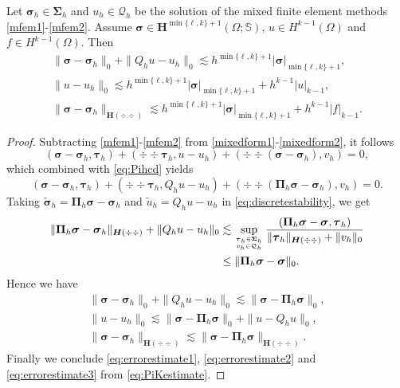 \begin{theorem}
Let $\boldsymbol \sigma_h\in\boldsymbol\Sigma_h$ and $u_h\in \mathcal Q_h$ be the solution of the mixed finite element methods \eqref{mfem1}-\eqref{mfem2}. Assume $\boldsymbol \sigma\in\boldsymbol{H}^{\min\{\ell,k\}+1}(\Omega; \mathbb{S})$, $u\in H^{k-1}(\Omega)$ and $f\in H^{k-1}(\Omega)$. Then
\begin{align}
\label{eq:errorestimate1}
\|\boldsymbol{\sigma}-\boldsymbol{\sigma}_h\|_0+\|Q_h u-u_h\|_0\lesssim h^{\min\{\ell,k\}+1}|\boldsymbol \sigma|_{\min\{\ell,k\}+1},
\\
\label{eq:errorestimate2}
\|u-u_h\|_0\lesssim h^{\min\{\ell,k\}+1}|\boldsymbol \sigma|_{\min\{\ell,k\}+1}+h^{k-1}|u|_{k-1},
\\
\label{eq:errorestimate3}
\|\boldsymbol{\sigma}-\boldsymbol{\sigma}_h\|_{\boldsymbol{H}(\div{\div })}\lesssim h^{\min\{\ell,k\}+1}|\boldsymbol \sigma|_{\min\{\ell,k\}+1}+h^{k-1}|f|_{k-1}.
\end{align}
\end{theorem}
\begin{proof}
Subtracting \eqref{mfem1}-\eqref{mfem2} from \eqref{mixedform1}-\eqref{mixedform2}, it follows
\[
(\boldsymbol{\sigma}-\boldsymbol{\sigma}_h, \boldsymbol{\tau}_h)+(\div \div\boldsymbol{\tau}_h, u-u_h)+(\div\div(\boldsymbol{\sigma}-\boldsymbol{\sigma}_h), v_h)=0,
\]
which combined with \eqref{eq:Pihcd} yields
\begin{equation}\label{eq:errorequation}
(\boldsymbol{\sigma}-\boldsymbol{\sigma}_h, \boldsymbol{\tau}_h)+(\div\div\boldsymbol{\tau}_h, Q_h u-u_h)+(\div\div(\boldsymbol \Pi_h\boldsymbol{\sigma}-\boldsymbol{\sigma}_h), v_h)=0.
\end{equation}
Taking $\widetilde{\boldsymbol{\sigma}}_h=\boldsymbol \Pi_h\boldsymbol{\sigma}-\boldsymbol{\sigma}_h$ and $\widetilde{u}_h=Q_h u-u_h$ in \eqref{eq:discretestability}, we get
\begin{align*}
\|\boldsymbol \Pi_h\boldsymbol{\sigma}-\boldsymbol{\sigma}_h\|_{\boldsymbol{H}(\div{\div })}+\|Q_h u-u_h\|_0&\lesssim \sup_{\boldsymbol{\tau}_h\in\boldsymbol\Sigma_h\atop v_h\in\mathcal Q_h}\frac{(\boldsymbol \Pi_h\boldsymbol{\sigma}-\boldsymbol{\sigma}, \boldsymbol{\tau}_h)}{\|\boldsymbol{\tau}_h\|_{\boldsymbol{H}(\div{\div })} + \|v_h\|_0} \\
&\leq \|\boldsymbol \Pi_h\boldsymbol{\sigma}-\boldsymbol{\sigma}\|_0.
\end{align*}
Hence we have
\begin{align*}
\|\boldsymbol{\sigma}-\boldsymbol{\sigma}_h\|_0+\|Q_h u-u_h\|_0\lesssim \|\boldsymbol{\sigma}-\boldsymbol \Pi_h\boldsymbol{\sigma}\|_0,
\\
\|u-u_h\|_0\lesssim \|\boldsymbol{\sigma}-\boldsymbol \Pi_h\boldsymbol{\sigma}\|_0+\|u-Q_h u\|_0,
\\
\|\boldsymbol{\sigma}-\boldsymbol{\sigma}_h\|_{\boldsymbol{H}(\div{\div })}\lesssim \|\boldsymbol{\sigma}-\boldsymbol \Pi_h\boldsymbol{\sigma}\|_{\boldsymbol{H}(\div{\div })}.
\end{align*}
Finally we conclude \eqref{eq:errorestimate1}, \eqref{eq:errorestimate2} and \eqref{eq:errorestimate3} from \eqref{eq:PiKestimate}.
\end{proof}

